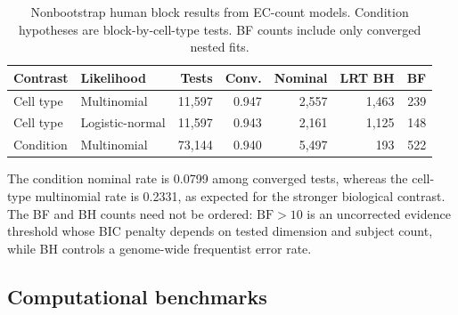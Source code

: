 \documentclass[11pt]{article}
\begin{document}
\begin{table}[H]
\centering
\scriptsize
\caption{Nonbootstrap human block results from EC-count models. Condition hypotheses are block-by-cell-type tests. BF counts include only converged nested fits.}
\label{tab:human-laplace-lrt}
\begin{tabular}{llrrrrr}
\toprule
Contrast & Likelihood & Tests & Conv. & Nominal & LRT BH & BF\\
\midrule
Cell type & Multinomial & 11,597 & 0.947 & 2,557 & 1,463 & 239\\
Cell type & Logistic-normal & 11,597 & 0.943 & 2,161 & 1,125 & 148\\
Condition & Multinomial & 73,144 & 0.940 & 5,497 & 193 & 522\\
\bottomrule
\end{tabular}
\end{table}

The condition nominal rate is 0.0799 among converged tests, whereas the cell-type multinomial rate is 0.2331, as expected for the stronger biological contrast. The BF and BH counts need not be ordered: \(\mathrm{BF}>10\) is an uncorrected evidence threshold whose BIC penalty depends on tested dimension and subject count, while BH controls a genome-wide frequentist error rate.

\subsection*{Computational benchmarks}
\end{document}
